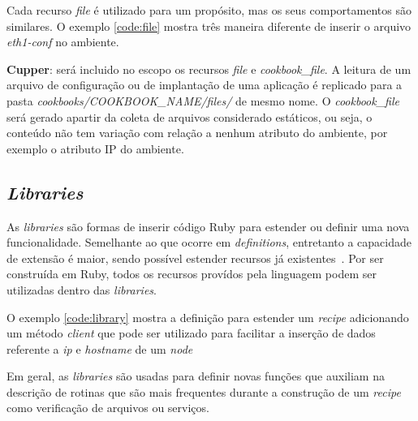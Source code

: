 Cada recurso \textit{file} é utilizado para um propósito, mas os seus comportamentos
são similares. O exemplo \ref{code:file} mostra três maneira diferente de
inserir o arquivo \textit{eth1-conf} no ambiente.

\begin{minipage}{.90\textwidth}
  \lstset{style=shell}
  
\end{minipage}

\textbf{Cupper}: será incluido no escopo os recursos \textit{file} e \textit{cookbook\_file}.
A leitura de um arquivo de configuração ou de implantação de uma aplicação 
é replicado para a pasta \textit{cookbooks/COOKBOOK\_NAME/files/} de mesmo nome.
O \textit{cookbook\_file} será gerado apartir da coleta de arquivos considerado estáticos,
ou seja, o conteúdo não tem variação com relação a nenhum atributo do ambiente,
por exemplo o atributo IP do ambiente.

\subsection{\textit{Libraries}}

As \textit{libraries} são formas de inserir código Ruby para estender ou definir
uma nova funcionalidade. Semelhante ao que ocorre em \textit{definitions}, entretanto a
capacidade de extensão é maior, sendo possível estender recursos já
existentes~\cite{chefdoc:2016}. Por ser construída em Ruby, todos os
recursos provídos pela linguagem podem ser utilizadas dentro das
\textit{libraries}.

O exemplo \ref{code:library} mostra a definição para estender um
\textit{recipe} adicionando um método \textit{client} que pode ser utilizado
para facilitar a inserção de dados referente a \textit{ip} e \textit{hostname} de um
\textit{node}

\begin{minipage}{.90\textwidth}
  \lstset{style=shell}
  
\end{minipage}

Em geral, as \textit{libraries} são usadas para definir novas funções que
auxiliam na descrição de rotinas que são mais frequentes durante a
construção de um \textit{recipe} como verificação de arquivos ou serviços.


